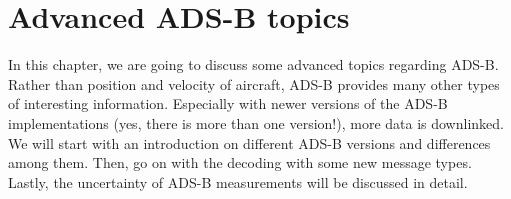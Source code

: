 \chapter{Advanced ADS-B topics} \label{advanced-topics}

In this chapter, we are going to discuss some advanced topics regarding ADS-B. Rather than position and velocity of aircraft, ADS-B provides many other types of interesting information. Especially with newer versions of the ADS-B implementations (yes, there is more than one version!), more data is downlinked. We will start with an introduction on different ADS-B versions and differences among them. Then, go on with the decoding with some new message types. Lastly, the uncertainty of ADS-B measurements will be discussed in detail.

